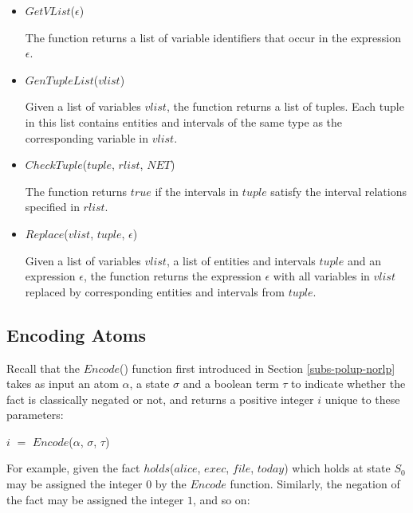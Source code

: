 \documentclass[11pt]{report}
\newenvironment{vquote}
{
  \begin{list}{}{\leftmargin 1em}\item[]
}
{
  \end{list}
}
\begin{document}
        \begin{itemize}
          \item
            $GetVList$($\epsilon$)

            The function returns a list of variable identifiers that occur
            in the expression $\epsilon$.

          \item
            $GenTupleList$($vlist$)

            Given a list of variables $vlist$, the function returns a list of
            tuples. Each tuple in this list contains entities and intervals
            of the same type as the corresponding variable in $vlist$.

          \item
            $CheckTuple$($tuple$, $rlist$, $NET$)

            The function returns $true$ if the intervals in $tuple$ satisfy
            the interval relations specified in $rlist$.

          \item
            $Replace$($vlist$, $tuple$, $\epsilon$)

            Given a list of variables $vlist$, a list of entities and
            intervals $tuple$ and an expression $\epsilon$, the function
            returns the expression $\epsilon$ with all variables in $vlist$
            replaced by corresponding entities and intervals from $tuple$.
        \end{itemize}

      \subsection{Encoding Atoms}
        \label{subs-impln-encod}

        Recall that the $Encode$() function first introduced in Section
        \ref{subs-polup-norlp} takes as input an atom $\alpha$, a state
        $\sigma$ and a boolean term $\tau$ to indicate whether the fact is
        classically negated or not, and returns a positive integer $i$
        unique to these parameters:

        \begin{vquote}
          $i$ $=$ $Encode$($\alpha$, $\sigma$, $\tau$)
        \end{vquote}

        For example, given the fact $holds$($alice$, $exec$, $file$,
        $today$) which holds at state $S_0$ may be assigned the integer
        $0$ by the $Encode$ function. Similarly, the negation of the fact
        may be assigned the integer $1$, and so on:
\end{document}
